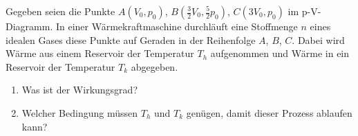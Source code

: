 \begin{Exercise}[label = Wärmekraftmaschine, origin = {4. Runde zur 46. IPhO 2015}, title = Wärmekraftmaschine, difficulty = 3]
Gegeben seien die Punkte $A(V_0,p_0)$, $B(\frac{3}{2}V_0,\frac{5}{2}	p_0)$, $C(3V_0,p_0)$ im p-V-Diagramm. In einer Wärmekraftmaschine durchläuft eine Stoffmenge $n$ eines idealen Gases diese Punkte auf Geraden in der Reihenfolge $A$, $B$, $C$. Dabei wird Wärme aus einem Reservoir der Temperatur $T_h$ aufgenommen und Wärme in ein Reservoir der Temperatur $T_k$ abgegeben.
\begin{enumerate}
\item Was ist der Wirkungsgrad?
\item Welcher Bedingung müssen $T_h$ und $T_k$ genügen, damit dieser Prozess ablaufen kann?
\end{enumerate}      	
\end{Exercise}
